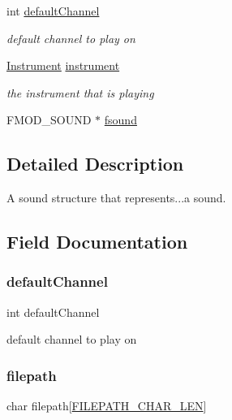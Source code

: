 \begin{DoxyCompactItemize}
int \hyperlink{structsound__s_a5a158796b730c78bbae975d936e229f0}{default\+Channel}
\begin{DoxyCompactList}\small\item\em default channel to play on \end{DoxyCompactList}\item 
\hyperlink{entity__s_8h_a498adc21b55fb917031c541073699945}{Instrument} \hyperlink{structsound__s_a88fb6e4086e01e476912df234d0f9d20}{instrument}
\begin{DoxyCompactList}\small\item\em the instrument that is playing \end{DoxyCompactList}\item 
F\+M\+O\+D\+\_\+\+S\+O\+U\+ND $\ast$ \hyperlink{structsound__s_ac1072fb2f49995e1342ffcfef83774c4}{fsound}
\end{DoxyCompactItemize}


\subsection{Detailed Description}
A sound structure that represents...a sound. 

\subsection{Field Documentation}
\mbox{\label{structsound__s_a5a158796b730c78bbae975d936e229f0}} 
\subsubsection{\texorpdfstring{default\+Channel}{defaultChannel}}
{\footnotesize\ttfamily int default\+Channel}



default channel to play on 

\mbox{\label{structsound__s_aa860b866620309ee03358dbb835ca4d7}} 
\subsubsection{\texorpdfstring{filepath}{filepath}}
{\footnotesize\ttfamily char filepath\mbox{[}\hyperlink{audio_8h_a5281214b81f606f6f569328db01cbbe6}{F\+I\+L\+E\+P\+A\+T\+H\+\_\+\+C\+H\+A\+R\+\_\+\+L\+EN}\mbox{]}}



